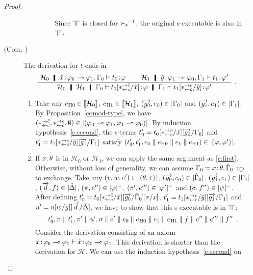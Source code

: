 \begin{proof}
\begin{description}
\begin{enumerate}[label=\textit{(\arabic{*})}]
\begin{description}
                    Since $\bbot$ is closed for ${\succ_{\mathsf s}}^{-1}$,
                    the original s-executable is also in $\bbot$.
              \end{description}
       \end{enumerate}
   \item[(Com, \textminus)]
	The derivation for $t$ ends in
	\[
	\aseq{\hyp{_0}\tj{\hat x}{\phi_0\limp\phi_1},\G_0}{\tj{t_0}{\phi}}
	\aseq{\hyp{_1}\tj{\hat y}{\phi_1\limp\phi_0},\G_1}{\tj{t_1}{\phi'}}
	\bseq{\hyp{_0}\hyp{_1}\G_0}{\tj{t_0[\comodL/\hat x]}{\phi}\hmid
	\G_1\tr \tj{t_1
	[\comodR/\hat y]}{\phi'}}
	\DisplayProof\enspace.
	\]
	\begin{enumerate}[label=\textit{(\arabic{*})}]
	\item Take any
	      $e_{\mathrm{H0}}\in\llbracket{\mathcal H_0}\rrbracket$,
	      $e_{\mathrm{H1}}\in\llbracket{\mathcal H_1}\rrbracket$,
	      $(\overrightarrow{g_0},{e_0})\in|{\Gamma_0}|$ and
	      $(\overrightarrow{g_1},{e_1})\in|{\Gamma_1}|$.
	      By Proposition~\ref{comod-type}, we have
	      $(\ast^{\rightarrow {\bar{c}}}_{\leftarrow{c}},\ast^{\rightarrow {c}}_{\leftarrow{\bar{c}}},\emptyset)\in|{(\varphi_0\multimap\varphi_1,\varphi_1\multimap\varphi_0)}|$.
	      By induction hypothesis~\ref{c:second}, the s-terms
	      $t'_0=t_0[\ast^{\rightarrow {\bar{c}}}_{\leftarrow{c}}/\hat{x}][\overrightarrow{g_0}/\Gamma_0]$ and
	      $t'_1=t_1[\ast^{\rightarrow {c}}_{\leftarrow{\bar{c}}}/\hat{y}][\overrightarrow{g_1}/\Gamma_1]$
	      satisfy
	      $(t_0',t_1',{e_0\parallel e_{\mathrm{H0}}}\parallel
	      {e_1\parallel e_{\mathrm{H1}}})\in|{(\varphi,\varphi')}|$.
	\item
	     If ${x} \mathord{\colon\kern -2pt}{\theta}$ is in $\mathcal H_0$ or $\mathcal H_1$,
	     we can apply the same argument as \ref{c:first}.
	     Otherwise,
	      without loss of generality,
	      we can assume
	      $\Gamma_0 ={x} \mathord{\colon\kern -2pt}{\theta}, {\hat{\Gamma}_0}$ up to exchange.
	      Take any
	      $(v,w,e')\in|{(\theta,\tau)}|$,
	     $(\overrightarrow{g_0},{e_0})\in|{\hat{\Gamma}_0}|$,
	     $(\overrightarrow{g_1},{e_1})\in|{\Gamma_1}|$,
	     $(\overrightarrow d, f)\in|{\hat{\Delta}}|$,
	     $(\pi,e'')\in|{\varphi}|^-$,
	     $(\pi',e''')\in|{\varphi'}|^-$
	     and
	     $(\sigma,f'')\in|{\psi}|^-$.
	     After defining $t_0' = t_0[\ast^{\rightarrow {\bar{c}}}_{\leftarrow{c}}/\hat
	     x][\overrightarrow{g_0}/\hat{\Gamma}_0][v/x]$,
	     $t'_1 = t_1[\ast^{\rightarrow {c}}_{\leftarrow{\bar{c}}}/\hat y][\overrightarrow{g_1}/\Gamma_1]$ and $u' =
	     u[w/y][\overrightarrow{d}/\hat{\Delta}]$,
	     we have to show that this s-executable is in $\bbot$:
	     \[
	      t'_0,\pi\parallel t'_1,\pi'\parallel u',\sigma\parallel e'\parallel
	     {e_0\parallel e_{\mathrm{H0}}}\parallel {e_1\parallel e_{\mathrm{H1}}}\parallel{f}\parallel e''\parallel
	     e'''\parallel f''\enspace.
	     \]
	     Consider the derivation consisting of an axiom
	     ${{\hat x} \mathord{\colon\kern -2pt}{\varphi_0\multimap\varphi_1}}\vdash{ {\hat x} \mathord{\colon\kern -2pt}{\varphi_0\multimap\varphi_1} }$.
	     This derivation is shorter than the derivation for
	     $\mathcal H$.
	     We can use the induction hypothesis~\ref{c:second} on

\end{enumerate}
\end{description}
\end{proof}
